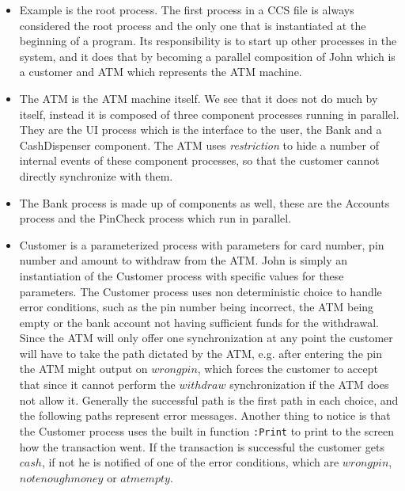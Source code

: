  \begin{itemize}
  
 		\item \textsf{Example} is the root process. The first process in a CCS 
 		file is always considered the root process and the only one that is 
 		instantiated at the beginning of a  program. Its responsibility is to 
 		start up other processes in the system, and it does that by becoming a 
 		parallel composition of \textsf{John} which is a customer and \textsf{ATM} 
 		which represents the ATM machine.
 		
		\item The \textsf{ATM} is the ATM machine itself. We see that it does not 
		do much by itself, instead it is composed of three component processes 
		running in parallel. They are the \textsf{UI} process which is the 
		interface to the user, the \textsf{Bank} and a \textsf{CashDispenser} 
		component. The \textsf{ATM} uses \textit{restriction} to hide a number of 
		internal events of these component processes, so that the customer cannot 
		directly synchronize with them.
		
		\item The \textsf{Bank} process is made up of components as well, these 
		are the \textsf{Accounts} process and the \textsf{PinCheck} process which 
		run in parallel.
		
		\item \textsf{Customer} is a parameterized process with parameters for 
		card number, pin number and amount to withdraw from the ATM. \textsf{John} 
		is simply an instantiation of the \textsf{Customer} process with specific 
		values for these parameters. The \textsf{Customer} process uses non 
		deterministic choice to handle error conditions, such as the pin number 
		being incorrect, the ATM being empty or the bank account not having 
		sufficient funds for the withdrawal. Since the ATM will only offer one 
		synchronization at any point the customer will have to take the path 
		dictated by the ATM, e.g. after entering the pin the ATM might output on 
		$wrongpin$, which forces the customer to accept that since it cannot 
		perform the $withdraw$ synchronization if the ATM does not allow it. 
		Generally the successful path is the first path in each choice, and the 
		following paths represent error messages. Another thing to notice is that
		the \textsf{Customer} process uses the built in function \texttt{:Print} to
		print to the screen how the transaction went. If the transaction is 
		successful the customer gets $cash$, if not he is notified of one of the 
		error conditions, which are $wrongpin$, $notenoughmoney$ or $atmempty$.
		

\end{itemize}
